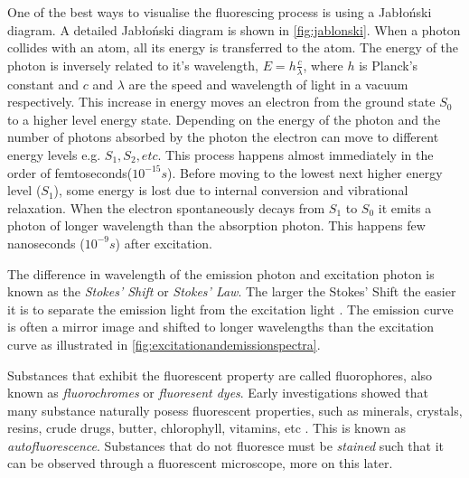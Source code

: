 \begin{definition}
	One of the best ways to visualise the fluorescing process is using a Jab{\l}o{\'n}ski diagram.
	A detailed Jab{\l}o{\'n}ski diagram is shown in \autoref{fig:jablonski}. 
	When a photon collides with an atom, all its energy is transferred to the atom. The energy of the photon is inversely related to it's wavelength, $E = h \frac{c}{\lambda}$, where $h$ is Planck's constant and $c$ and $\lambda$ are the speed and wavelength of light in a vacuum respectively.
	This increase in energy moves an electron from the ground state $S_0$ to a higher level energy state.
	Depending on the energy of the photon and the number of photons absorbed by the photon the electron can move to different energy levels e.g. $S_1, S_2, etc$.
	This process happens almost immediately in the order of femtoseconds($10^{-15}s$).
	Before moving to the lowest next higher energy level ($S_1$), some energy is lost due to internal conversion and vibrational relaxation.
	When the electron spontaneously decays from $S_1$ to $S_0$ it emits a photon of longer wavelength than the absorption photon.
	This happens few nanoseconds ($10^{-9}s$) after excitation.
	
	The difference in wavelength of the emission photon and excitation photon is known as the \textit{Stokes' Shift} or \textit{Stokes' Law}.
	The larger the Stokes' Shift the easier it is to separate the emission light from the excitation light \citep{Spring2003}.
	The emission curve is often a mirror image and shifted to longer wavelengths than the excitation curve as illustrated in \autoref{fig:excitationandemissionspectra}.
\end{definition}

\begin{definition}[Fluorophores]
	Substances that exhibit the fluorescent property are called fluorophores, also known as \textit{fluorochromes} or \textit{fluoresent dyes}.
	Early investigations showed that many substance naturally posess fluorescent properties, such as minerals, crystals, resins, crude drugs, butter, chlorophyll, vitamins, etc \citep{Spring2003}.
	This is known as \textit{autofluorescence}.
	Substances that do not fluoresce must be \textit{stained} such that it can be observed through a fluorescent microscope, more on this later.
\end{definition}


